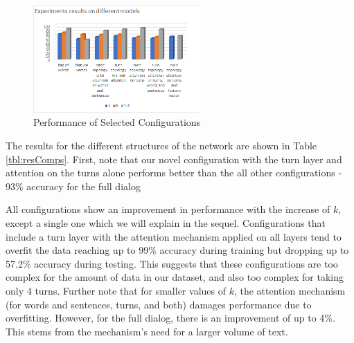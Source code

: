 \begin{figure}[]
    \hspace*{-0.8cm}
    \centering
        \centering
        \includegraphics[trim=0cm 0.5cm 0cm 0cm, width=2.5in]{exp/exp.png}
        \caption{Performance of Selected Configurations}
        \label{graph:quality}
    \vspace{-4mm}
\end{figure}


The results for the different structures of the network are shown in Table \ref{tbl:resComps}. 
First, note that our novel configuration with the turn layer and attention on the turns alone 
performs better than the all other configurations - 93\% accuracy for the full dialog 

All configurations show an improvement in performance with the increase of $k$, 
except a single one which we will explain in the sequel. 
Configurations that include a turn layer with the attention mechanism applied on all layers 
tend to overfit the data reaching up to 99\% accuracy during training but 
dropping up to 57.2\% accuracy during testing. 
This suggests that these configurations are too complex for the amount of data in our dataset,
and also too complex for taking only 4 turns. 
Further note that for smaller values of $k$, the attention mechanism 
(for words and sentences, turns, and both) damages performance due to overfitting. 
However, for the full dialog, there is an improvement of up to 4\%. 
This stems from the mechanism's need for a larger volume of text.

